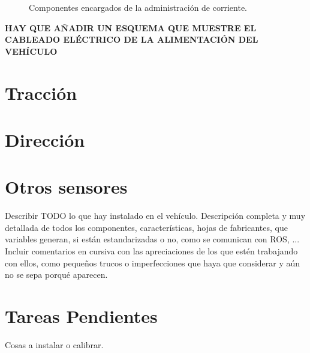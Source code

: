 \begin{figure}[h!]
\begin{center}
	\caption{Componentes encargados de la administración de corriente.}
\end{center}
\end{figure}

\textbf{HAY QUE AÑADIR UN ESQUEMA QUE MUESTRE EL CABLEADO ELÉCTRICO DE LA ALIMENTACIÓN DEL VEHÍCULO}

\section{Tracción}

\section{Dirección}

\section{Otros sensores}


Describir TODO lo que hay instalado en el vehículo. Descripción completa y muy detallada de todos los componentes, características, hojas de fabricantes, que variables generan, si están estandarizadas o no, como se comunican con ROS, ... Incluir comentarios en cursiva con las apreciaciones de los que estén trabajando con ellos, como pequeños trucos o imperfecciones que haya que considerar y aún no se sepa porqué aparecen.

\section{Tareas Pendientes}
Cosas a instalar o calibrar.